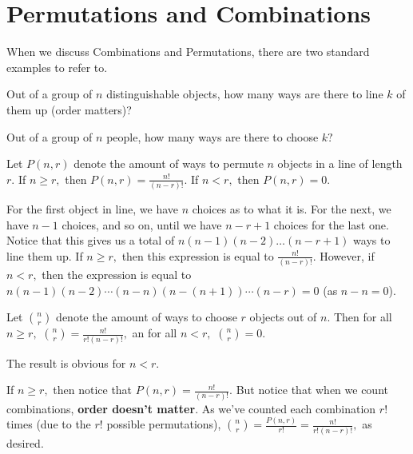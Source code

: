 \documentclass[blue,onecol]{shooting}
\begin{document}
\section{Permutations and Combinations}

When we discuss Combinations and Permutations, there are two standard examples to refer to.

\begin{exam}[Permutations]
Out of a group of $n$ distinguishable objects, how many ways are there to line $k$ of them up (order matters)?
\end{exam}

\begin{exam}[Combinations]
Out of a group of $n$ people, how many ways are there to choose $k?$
\end{exam}

\begin{theo}[Permutations]
Let $P(n,r)$ denote the amount of ways to permute $n$ objects in a line of length $r.$ If $n\geq r,$ then $P(n,r)=\frac{n!}{(n-r)!}.$ If $n<r,$ then $P(n,r)=0.$
\end{theo}

\begin{pro}
For the first object in line, we have $n$ choices as to what it is. For the next, we have $n-1$ choices, and so on, until we have $n-r+1$ choices for the last one. Notice that this gives us a total of $n(n-1)(n-2)\dots(n-r+1)$ ways to line them up. If $n\geq r,$ then this expression is equal to $\frac{n!}{(n-r)!}.$ However, if $n<r,$ then the expression is equal to $n(n-1)(n-2)\cdots(n-n)(n-(n+1))\cdots(n-r)=0$ (as $n-n=0$).
\end{pro}

\begin{theo}[Combinations]
Let $\binom{n}{r}$ denote the amount of ways to choose $r$ objects out of $n.$ Then for all $n\geq r,$ $\binom{n}{r}=\frac{n!}{r!(n-r)!},$ an for all $n<r,$ $\binom{n}{r}=0.$
\end{theo}

\begin{pro}
The result is obvious for $n<r.$

If $n\geq r,$ then notice that $P(n,r)=\frac{n!}{(n-r)!}.$ But notice that when we count combinations, \textbf{order doesn't matter}. As we've counted each combination $r!$ times (due to the $r!$ possible permutations), $\binom{n}{r}=\frac{P(n,r)}{r!}=\frac{n!}{r!(n-r)!},$ as desired.
\end{pro}
\end{document}

